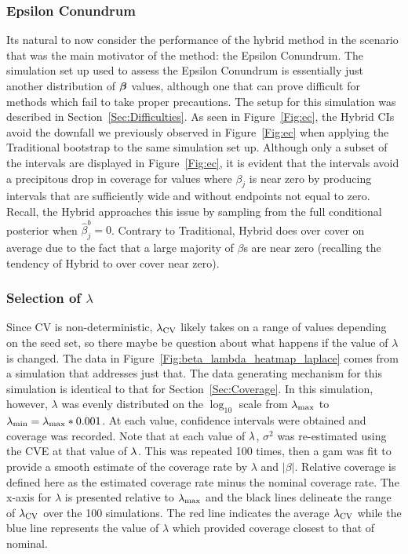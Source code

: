 \subsubsection{Epsilon Conundrum}\label{Sec:Epsilon}


Its natural to now consider the performance of the hybrid method in the scenario that was the main motivator of the method: the Epsilon Conundrum. The simulation set up used to assess the Epsilon Conundrum is essentially just another distribution of $\boldsymbol{\beta}$ values, although one that can prove difficult for methods which fail to take proper precautions. The setup for this simulation was described in Section~\ref{Sec:Difficulties}. As seen in Figure~\ref{Fig:ec}, the Hybrid CIs avoid the downfall we previously observed in Figure~\ref{Fig:ec} when applying the Traditional bootstrap to the same simulation set up. Although only a subset of the intervals are displayed in Figure~\ref{Fig:ec}, it is evident that the intervals avoid a precipitous drop in coverage for values where $\beta_j$ is near zero by producing intervals that are sufficiently wide and without endpoints not equal to zero. Recall, the Hybrid approaches this issue by sampling from the full conditional posterior when $\hat{\beta}_j^b = 0$. Contrary to Traditional, Hybrid does over cover on average due to the fact that a large majority of $\beta$s are near zero (recalling the tendency of Hybrid to over cover near zero). 


\subsubsection{Selection of \texorpdfstring{$\lambda$}{lambda}} \label{Sec:lambda}

Since CV is non-deterministic, $\lambda_{\textrm{CV}}$ likely takes on a range of values depending on the seed set, so there maybe be question about what happens if the value of $\lambda$ is changed. The data in Figure~\ref{Fig:beta_lambda_heatmap_laplace} comes from a simulation that addresses just that. The data generating mechanism for this simulation is identical to that for Section~\ref{Sec:Coverage}. In this simulation, however, $\lambda$ was evenly distributed on the $\log_{10}$ scale from $\lambda_{\max}$ to $\lambda_{\min} = \lambda_{\max} * 0.001$. At each value, confidence intervals were obtained and coverage was recorded. Note that at each value of $\lambda$, $\sigma^2$ was re-estimated using the CVE at that value of $\lambda$. This was repeated 100 times, then a gam was fit to provide a smooth estimate of the coverage rate by $\lambda$ and $|\beta|$. Relative coverage is defined here as the estimated coverage rate minus the nominal coverage rate. The x-axis for $\lambda$ is presented relative to $\lambda_{\max}$ and the black lines delineate the range of $\lambda_{\textrm{CV}}$ over the 100 simulations. The red line indicates the average $\lambda_{\textrm{CV}}$ while the blue line represents the value of $\lambda$ which provided coverage closest to that of nominal.

